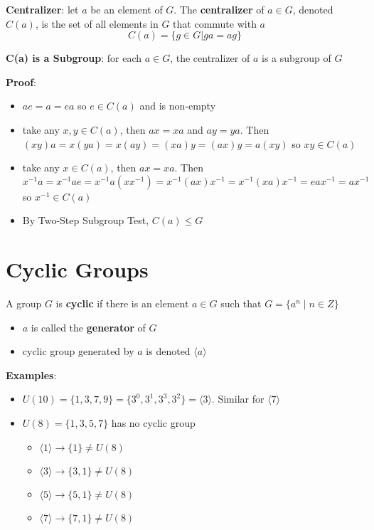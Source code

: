 \documentclass{article}
\begin{document}
  \bigskip

  \textbf{Centralizer}: let $a$ be an element of $G$. The \textbf{centralizer} of $a \in G$, denoted $C(a)$, is the set of all elements in $G$ that commute with $a$
  \[C(a) = \{g \in G | ga = ag\}\]

  \textbf{C(a) is a Subgroup}: for each $a \in G$, the centralizer of $a$ is a subgroup of $G$

  \textbf{Proof}:
  \begin{itemize}
    \item $ae = a = ea$ so $e \in C(a)$ and is non-empty
    \item take any $x, y \in C(a)$, then $ax = xa$ and $ay = ya$. Then $(xy)a = x(ya) = x(ay) = (xa)y = (ax)y = a(xy)$ so $xy \in C(a)$
    \item take any $x \in C(a)$, then $ax = xa$. Then $x^{-1}a = x^{-1}ae = x^{-1}a(xx^{-1}) = x^{-1}(ax)x^{-1} = x^{-1}(xa)x^{-1} = eax^{-1} = ax^{-1}$ so $x^{-1} \in C(a)$
    \item By Two-Step Subgroup Test, $C(a) \leq G$
  \end{itemize}
  \section{Cyclic Groups}
  A group $G$ is \textbf{cyclic} if there is an element $a \in G$ such that $G = \{a^n \mid n \in Z\}$
  \begin{itemize}
    \item $a$ is called the \textbf{generator} of $G$
    \item cyclic group generated by $a$ is denoted $\langle a \rangle$
  \end{itemize}
  \textbf{Examples}:
  \begin{itemize}
    \item $U(10) = \{1, 3, 7, 9\} = \{3^0, 3^1, 3^3, 3^2\} = \langle 3 \rangle$. Similar for $\langle 7 \rangle$
    \item $U(8) = \{1, 3, 5, 7\}$ has no cyclic group
      \begin{itemize}
        \item $\langle 1 \rangle \rightarrow \{1\} \neq U(8)$
        \item $\langle 3 \rangle \rightarrow \{3, 1\} \neq U(8)$
        \item $\langle 5 \rangle \rightarrow \{5, 1\} \neq U(8)$
        \item $\langle 7 \rangle \rightarrow \{7, 1\} \neq U(8)$
      \end{itemize}
  \end{itemize}
\end{document}
